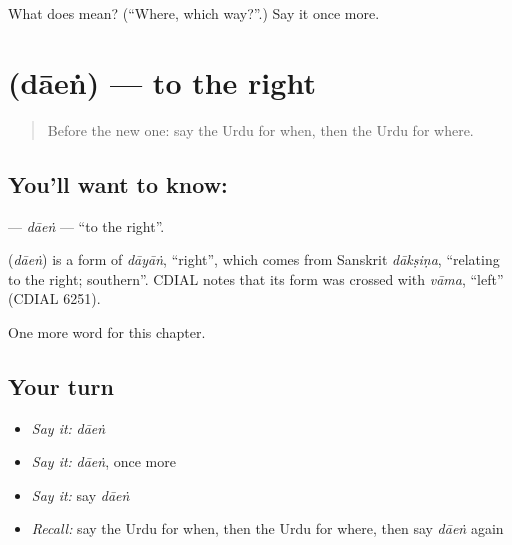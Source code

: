 \begin{tcolorbox}[breakable,colback=teal!4,colframe=teal!35!black,title={Before you move on}]
What does  mean? (\textquotedblleft{}Where, which way?\textquotedblright{}.) Say it once more.
\end{tcolorbox}
\section[\texorpdfstring{\ur{دائیں} (dāeṅ)}{دائیں (dāeṅ)}]{ (dāeṅ) — to the right}

\label{lesson:UR-C96-daen}



\begin{quote}
Before the new one: say the Urdu for when, then the Urdu for where.
\end{quote}

\subsection*{You'll want to know: }
\textbf{} — \emph{dāeṅ} — \textquotedblleft{}to the right\textquotedblright{}.

\begin{cousinweb}
\textbf{} (\emph{dāeṅ}) is a form of \emph{dāyāṅ}, \textquotedblleft{}right\textquotedblright{}, which comes from Sanskrit \emph{dākṣiṇa}, \textquotedblleft{}relating to the right; southern\textquotedblright{}. CDIAL notes that its form was crossed with \emph{vāma}, \textquotedblleft{}left\textquotedblright{} (CDIAL 6251).
\end{cousinweb}

\begin{grammarlens}[title={What you've built}]
One more word for this chapter.
\end{grammarlens}

\subsection*{Your turn}
\begin{itemize}
\raggedright
  \item \emph{Say it:} \emph{dāeṅ}
  \item \emph{Say it:} \emph{dāeṅ}, once more
  \item \emph{Say it:} say \emph{dāeṅ}
  \item \emph{Recall:} say the Urdu for when, then the Urdu for where, then say \emph{dāeṅ} again
\end{itemize}

